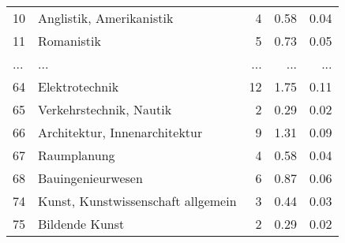 \begin{longtable}{lXrrr}
        10 & \multicolumn{1}{X}{Anglistik, Amerikanistik} & %
          \num{4} &
          \num[round-mode=places,round-precision=2]{0,58} &
          \num[round-mode=places,round-precision=2]{0,04} \\
        11 & \multicolumn{1}{X}{Romanistik} & %
          \num{5} &
          \num[round-mode=places,round-precision=2]{0,73} &
          \num[round-mode=places,round-precision=2]{0,05} \\
       ... & ... & ... & ... & ... \\
        64 & \multicolumn{1}{X}{Elektrotechnik} & %
          \num{12} &
          \num[round-mode=places,round-precision=2]{1,75} &
          \num[round-mode=places,round-precision=2]{0,11} \\

        65 & \multicolumn{1}{X}{Verkehrstechnik, Nautik} & %
          \num{2} &
          \num[round-mode=places,round-precision=2]{0,29} &
          \num[round-mode=places,round-precision=2]{0,02} \\

        66 & \multicolumn{1}{X}{Architektur, Innenarchitektur} & %
          \num{9} &
          \num[round-mode=places,round-precision=2]{1,31} &
          \num[round-mode=places,round-precision=2]{0,09} \\

        67 & \multicolumn{1}{X}{Raumplanung} & %
          \num{4} &
          \num[round-mode=places,round-precision=2]{0,58} &
          \num[round-mode=places,round-precision=2]{0,04} \\

        68 & \multicolumn{1}{X}{Bauingenieurwesen} & %
          \num{6} &
          \num[round-mode=places,round-precision=2]{0,87} &
          \num[round-mode=places,round-precision=2]{0,06} \\

        74 & \multicolumn{1}{X}{Kunst, Kunstwissenschaft allgemein} & %
          \num{3} &
          \num[round-mode=places,round-precision=2]{0,44} &
          \num[round-mode=places,round-precision=2]{0,03} \\

        75 & \multicolumn{1}{X}{Bildende Kunst} & %
          \num{2} &
          \num[round-mode=places,round-precision=2]{0,29} &
          \num[round-mode=places,round-precision=2]{0,02} \\


\end{longtable}
